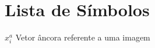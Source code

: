 \chapter*{Lista de Símbolos}

\begin{description}
    \item $x^{a}_{i}$ \quad Vetor âncora referente a uma imagem 
     
\end{description}